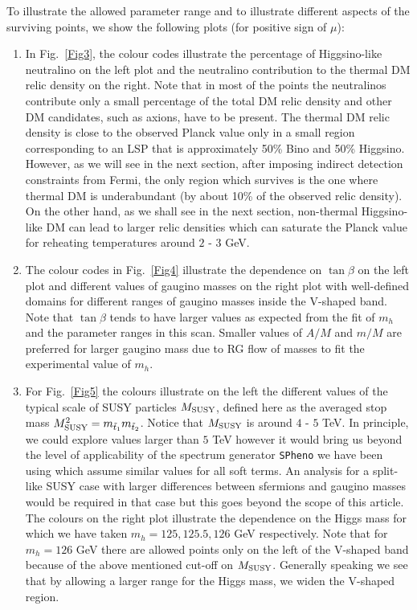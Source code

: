 \documentclass[11pt,a4paper]{article}
\begin{document}
To illustrate the allowed parameter range and to illustrate different aspects of the surviving points, we show the following plots (for positive sign of $\mu$):
\begin{enumerate}
\item In Fig.~\ref{Fig3}, the colour codes illustrate the percentage of Higgsino-like neutralino on the left plot and the neutralino contribution to the thermal DM relic density on the right. Note that in most of the points the neutralinos contribute only a small percentage of the total DM relic density and other DM candidates, such as axions, have to be present. The thermal DM relic density is close to the observed Planck value only in a small region corresponding to an LSP that is approximately 50\% Bino and 50\% Higgsino. However, as we will see in the next section, after imposing indirect detection constraints from Fermi, the only region which survives is the one where thermal DM is underabundant (by about 10\% of the observed relic density). On the other hand, as we shall see in the next section, non-thermal Higgsino-like DM can lead to larger relic densities which can saturate the Planck value for reheating temperatures around $2$ - $3$ GeV.

\item The colour codes in Fig.~\ref{Fig4} illustrate the dependence on $\tan\beta$ on the left plot and different values of gaugino masses on the right plot with well-defined domains for different ranges of gaugino masses inside the V-shaped band. Note that $\tan\beta$ tends to have larger values as expected from the fit of $m_h$ and the parameter ranges in this scan. Smaller values of $A/M$ and $m/M$ are preferred for larger gaugino mass due to RG flow of masses to fit the experimental value of $m_h$.

\item For Fig.~\ref{Fig5} the colours illustrate on the left the different values of the typical scale of SUSY particles $M_{\rm SUSY}$, defined here as the averaged stop mass $M_{\rm SUSY}^2=m_{\tilde{t}_1} m_{\tilde{t}_2}$. Notice that $M_{\rm SUSY}$ is around $4$ - $5$ TeV. In principle, we could explore values larger than $5$ TeV however it would bring us beyond the level of applicability of the spectrum generator \verb"SPheno" we have been using which assume similar values for all soft terms. An analysis for a split-like SUSY case with larger differences between sfermions and gaugino masses would be required in that case but this goes beyond the scope of this article. The colours on the right plot illustrate the dependence on the Higgs mass for which we have taken $m_h=125, 125.5, 126$ GeV respectively. Note that for $m_h=126$ GeV there are allowed points only on the left of the V-shaped band because of the above mentioned cut-off on $M_{\rm SUSY}$. Generally speaking we see that by allowing a larger range for the Higgs mass, we widen the V-shaped region. 
\end{enumerate}
\end{document}
